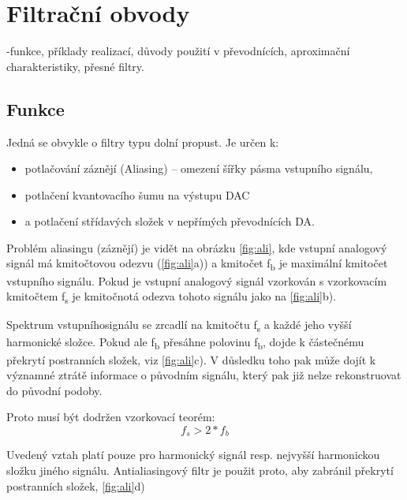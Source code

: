 \section{Filtrační obvody}
-funkce, příklady realizací, důvody použití v převodnících, aproximační charakteristiky, přesné filtry.

\subsection{Funkce}
Jedná se obvykle o filtry typu dolní propust.
Je určen k:
\begin{itemize}
\item potlačování záznějí (Aliasing) – omezení šířky pásma vstupního signálu,
\item  potlačení kvantovacího šumu na výstupu DAC
\item a potlačení střídavých složek v nepřímých převodnících DA.
\end{itemize}

Problém aliasingu (záznějí) je vidět na obrázku \ref{fig:ali}, kde vstupní analogový signál má kmitočtovou odezvu (\ref{fig:ali}a)) a kmitočet f\textsubscript{b} je maximální kmitočet vstupního signálu. Pokud je vstupní analogový signál vzorkován s vzorkovacím kmitočtem f\textsubscript{s} je kmitočnotá odezva tohoto signálu jako na \ref{fig:ali}b).

Spektrum vstupníhosignálu se zrcadlí na kmitočtu f\textsubscript{s} a každé jeho vyšší harmonické složce. Pokud ale f\textsubscript{b} přesáhne polovinu f\textsubscript{b}, dojde k částečnému překrytí postranních složek, viz \ref{fig:ali}c). V důsledku toho pak může dojít k významné ztrátě informace o původním signálu, který pak již nelze rekonstruovat do původní podoby.

Proto musí být dodržen vzorkovací teorém:
\begin{equation}
 f_{s} > 2*f_{b}
\end{equation}

Uvedený vztah platí pouze pro harmonický signál resp. nejvyšší harmonickou složku jiného signálu. Antialiasingový filtr je použit proto, aby zabránil překrytí postranních složek, \ref{fig:ali}d)

